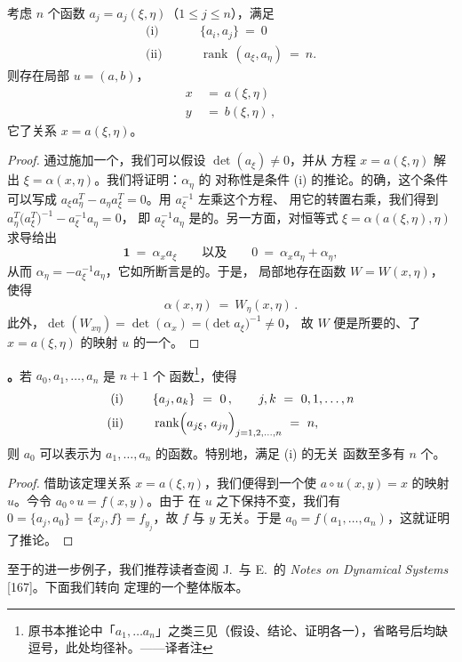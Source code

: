 \begin{theorem}[\trLiouville]\label{thm:a1-liouville}
考虑 $n$ 个函数 $a_{j}=a_{j}(\xi,\eta)$（$1\leq j\leq n$），满足
\begin{align*}
\text{(i)}\qquad&\ \{a_{i},a_{j}\}\ =\ 0\\
\text{(ii)}\qquad&\ \operatorname{rank}\,(a_{\xi},a_{\eta})\ =\ n.
\end{align*}
则存在局部\trSymplecticDiffeomorphism{} $u=(a,b)$，
\[
\begin{aligned}
x\ &=\ a(\xi,\eta)\\
y\ &=\ b(\xi,\eta)\,,
\end{aligned}
\]
它\trContinuation{}了关系 $x=a(\xi,\eta)$。
\end{theorem}

\begin{proof}
通过施加一个\trElementary\trSymplectic{}\trTransformation{}，我们可以假设 $\det(a_{\xi})\neq0$，并从%
方程 $x=a(\xi,\eta)$ 解出 $\xi=\alpha(x,\eta)$。我们将证明：$\alpha_{\eta}$ 的%
对称性是条件 (i) 的推论。的确，这个条件可以写成%
 $a_{\xi}a_{\eta}^{T}-a_{\eta}a_{\xi}^{T}=0$。用 $a_{\xi}^{-1}$ 左乘这个方程、%
用它的转置右乘，我们得到 $a_{\eta}^{T}\bigl(a_{\xi}^{T}\bigr)^{-1}-a_{\xi}^{-1}a_{\eta}=0$，%
即 $a_{\xi}^{-1}a_{\eta}$ 是\trSymmetric{}的。另一方面，对恒等式%
 $\xi=\alpha(a(\xi,\eta),\eta)$ 求导给出
\[
\mathbf{1}\ =\ \alpha_{x}a_{\xi}\qquad\text{以及}\qquad 0\ =\ \alpha_{x}a_{\eta}+\alpha_{\eta},
\]
从而 $\alpha_{\eta}=-a_{\xi}^{-1}a_{\eta}$，它如所断言是\trSymmetric{}的。于是，%
局部地存在函数 $W=W(x,\eta)$，使得
\[
\alpha(x,\eta)\ =\ W_{\eta}(x,\eta)\,.
\]
此外，$\det(W_{x\eta})=\det(\alpha_{x})=\bigl(\det a_{\xi}\bigr)^{-1}\neq0$，%
故 $W$ 便是所要的、\trContinuation{}了 $x=a(\xi,\eta)$ 的\trSymplectic{}映射%
 $u$ 的一个\trGeneratingFunction。
\end{proof}

\noindent\textbf{\trhCorollary。}\quad 若 $a_{0},a_{1},\ldots,a_{n}$ 是 $n+1$ 个%
函数\footnote{原书本推论中「$a_{1},\ldots a_{n}$」之类三见（假设、结论、证明各一），省略号后均缺逗号，此处均径补。——译者注}，使得
\begin{align*}
\text{(i)}\qquad&\ \{a_{j},a_{k}\}\ =\ 0\,,\qquad j,k\ =\ 0,1,\ldots,n\\
\text{(ii)}\qquad&\ \operatorname{rank}\Bigl(a_{j\xi},\,a_{j\eta}\Bigr)_{j=1,2,\ldots,n}\ =\ n,
\end{align*}
则 $a_{0}$ 可以表示为 $a_{1},\ldots,a_{n}$ 的函数。特别地，满足 (i) 的无关%
函数至多有 $n$ 个。

\begin{proof}
借助该定理\trContinuation{}关系 $x=a(\xi,\eta)$，我们便得到一个使%
 $a\circ u(x,y)=x$ 的\trSymplectic{}映射 $u$。今令 $a_{0}\circ u=f(x,y)$。由于%
\trPoissonBracket{}在 $u$ 之下保持不变，我们有%
 $0=\{a_{j},a_{0}\}=\{x_{j},f\}=f_{y_{j}}$，故 $f$ 与 $y$ 无关。于是%
 $a_{0}=f(a_{1},\ldots,a_{n})$，这就证明了推论。
\end{proof}

至于\trGeneratingFunction{}的进一步例子，我们推荐读者查阅 J.~\trMoser{}与%
 E.~\trZehnder{}的 \emph{Notes on Dynamical Systems} [167]。下面我们转向%
\trLiouville{}定理的一个整体版本。
